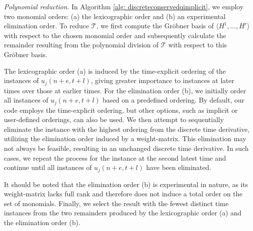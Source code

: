 \documentclass[runningheads]{llncs}
\newcommand{\1}{\chi}
\begin{document}
\emph{Polynomial reduction.}
In Algorithm \ref{alg: discreteconservedqimplicit}, we employ two monomial orders: (a) the lexicographic order and (b) an experimental elimination order. To reduce \(\mathcal{T}\), we first compute the Gr\"obner basis of \(\langle H^1,\ldots,H^r\rangle\) with respect to the chosen monomial order and subsequently calculate the remainder resulting from the polynomial division of \(\mathcal{T}\) with respect to this Gr\"obner basis.

The lexicographic order (a) is induced by the time-explicit ordering of the instances of \(u_j(n+e,t+l)\), giving greater importance to instances at later times over those at earlier times. For the elimination order (b), we initially order all instances of \(u_j(n+e,t+l)\) based on a predefined ordering. By default, our code employs the time-explicit ordering, but other options, such as implicit or user-defined orderings, can also be used. We then attempt to sequentially eliminate the instance with the highest ordering from the discrete time derivative, utilizing the elimination order induced by a weight-matrix. This elimination may not always be feasible, resulting in an unchanged discrete time derivative. In such cases, we repeat the process for the instance at the second latest time and continue until all instances of \(u_j(n+e,t+l)\) have been eliminated.

It should be noted that the elimination order (b) is experimental in nature, as its weight-matrix lacks full rank and therefore does not induce a total order on the set of monomials. Finally, we select the result with the fewest distinct time instances from the two remainders produced by the lexicographic order (a) and the elimination order (b).
\end{document}
